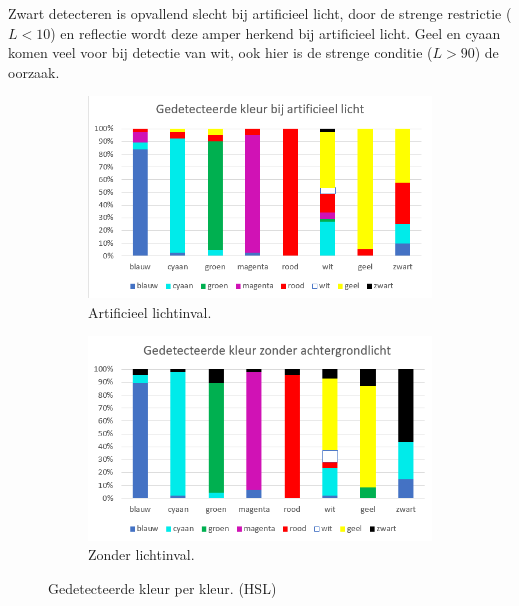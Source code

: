 Zwart detecteren is opvallend slecht bij artificieel licht, door de strenge restrictie ($L < 10$) en reflectie wordt deze amper herkend bij artificieel licht. Geel en cyaan komen veel voor bij detectie van wit, ook hier is de strenge conditie ($L > 90$) de oorzaak.

\begin{figure}
	\begin{subfigure}{0.5\textwidth}
	\centering
	\includegraphics[scale=0.6]{img/artificialLightning}
	\caption{Artificieel lichtinval.}
	\end{subfigure}
	\begin{subfigure}{0.5\textwidth}
	\centering
	\includegraphics[scale=0.6]{img/noneLightning}
	\caption{Zonder lichtinval.}
	\end{subfigure}
	\caption{Gedetecteerde kleur per kleur. (HSL)}
	\label{fig:lichtinval}
\end{figure}


